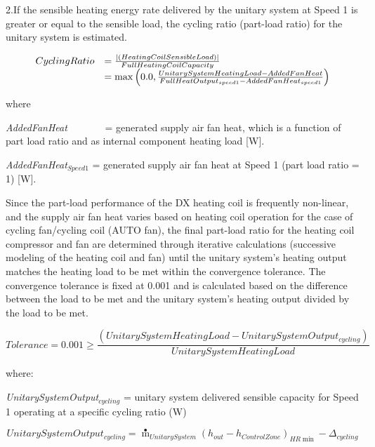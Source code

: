 2.If the sensible heating energy rate delivered by the unitary system at Speed 1 is greater or equal to the sensible load, the cycling ratio (part-load ratio) for the unitary system is estimated.

\begin{equation}
  \begin{array}{rl}
    CyclingRatio &= \frac{\left|\PB{HeatingCoilSensibleLoad}\right|}{FullHeatingCoilCapacity} \\
                 &= \max \PB{0.0,\frac{UnitarySystemHeatingLoad - AddedFanHeat}{FullHeatOutput_{speed1} - AddedFanHeat_{speed1}}}
  \end{array}
\end{equation}

where

\emph{AddedFanHeat}~~~~~~~ = generated supply air fan heat, which is a function of part load ratio and as internal component heating load {[}W{]}.

\emph{AddedFanHeat\(_{Speed1}\)} = generated supply air fan heat at Speed 1 (part load ratio = 1) {[}W{]}.

Since the part-load performance of the DX heating coil is frequently non-linear, and the supply air fan heat varies based on heating coil operation for the case of cycling fan/cycling coil (AUTO fan), the final part-load ratio for the heating coil compressor and fan are determined through iterative calculations (successive modeling of the heating coil and fan) until the unitary system's heating output matches the heating load to be met within the convergence tolerance. The convergence tolerance is fixed at 0.001 and is calculated based on the difference between the load to be met and the unitary system's heating output divided by the load to be met.

\begin{equation}
Tolerance = 0.001 \ge \frac{{\left( {UnitarySystemHeatingLoad - UnitarySystemOutpu{t_{cycling}}} \right)}}{{UnitarySystemHeatingLoad}}
\end{equation}

where:

\emph{UnitarySystemOutput\(_{cycling}\)} = unitary system delivered sensible capacity for Speed 1 operating at a specific cycling ratio (W)

\begin{equation}
UnitarySystemOutpu{t_{cycling}} = {{\mathop m\limits^ \bullet  }_{UnitarySystem}}{\left( {{h_{out}} - {h_{ControlZone}}} \right)_{HR\min }} - {\Delta_{cycling}}
\end{equation}

